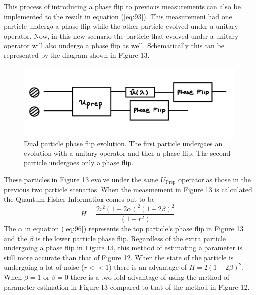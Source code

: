 \documentclass[twocolumn]{article}
\begin{document}
This process of introducing a phase flip to previous measurements can also be implemented to the result in equation (\ref{eq:93}). This measurement had one particle undergo a phase flip while the other particle evolved under a unitary operator. Now, in this new scenario the particle that evolved under a unitary operator will also undergo a phase flip as well. Schematically this can be represented by the diagram shown in Figure 13.
\begin{figure}[h]
\begin{center}
\includegraphics[width=0.70\linewidth]{TP-Dual-Phase-Flip.PNG}
\caption{Dual particle phase flip evolution. The first particle undergoes an evolution with a unitary operator and then a phase flip. The second particle undergoes only a phase flip.}
\end{center}
\end{figure}
\newline
These particles in Figure 13 evolve under the same $U_{\text{Prep}}$ operator as those in the previous two particle scenarios. When the measurement in Figure 13 is calculated the Quantum Fisher Information comes out to be
\begin{equation}\label{eq:96}
H=\frac{2r^2(1-2\alpha)^2(1-2\beta)^2}{(1+r^2)}.
\end{equation}
The $\alpha$ in equation (\ref{eq:96}) represents the top particle's phase flip in Figure 13 and the $\beta$ is the lower particle phase flip. Regardless of the extra particle undergoing a phase flip in Figure 13, this method of estimating a parameter is still more accurate than that of Figure 12. When the state of the particle is undergoing a lot of noise ($r<<1$) there is an advantage of $H=2(1-2\beta)^2$. When $\beta=1$ or $\beta=0$ there is a two-fold advantage of using the method of parameter estimation in Figure 13 compared to that of the method in Figure 12.
\end{document}
